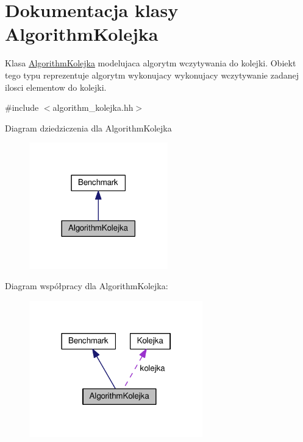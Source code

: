 \hypertarget{class_algorithm_kolejka}{\section{Dokumentacja klasy Algorithm\-Kolejka}
\label{class_algorithm_kolejka}
}


Klasa \hyperlink{class_algorithm_kolejka}{Algorithm\-Kolejka} modelujaca algorytm wczytywania do kolejki. Obiekt tego typu reprezentuje algorytm wykonujacy wykonujacy wczytywanie zadanej ilosci elementow do kolejki.  




{\ttfamily \#include $<$algorithm\-\_\-kolejka.\-hh$>$}



Diagram dziedziczenia dla Algorithm\-Kolejka\nopagebreak
\begin{figure}[H]
\begin{center}
\leavevmode
\includegraphics[width=170pt]{class_algorithm_kolejka__inherit__graph}
\end{center}
\end{figure}


Diagram współpracy dla Algorithm\-Kolejka\-:\nopagebreak
\begin{figure}[H]
\begin{center}
\leavevmode
\includegraphics[width=213pt]{class_algorithm_kolejka__coll__graph}
\end{center}
\end{figure}
